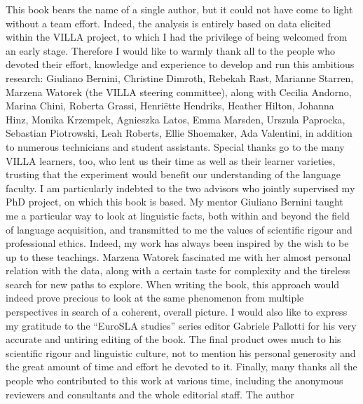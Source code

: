 
This book bears the name of a single author, but it could not have come to light without a team effort. Indeed, the analysis is entirely based on data elicited within the VILLA project, to which I had the privilege of being welcomed from an early stage. Therefore I would like to warmly thank all to the people who devoted their effort, knowledge and experience to develop and run this ambitious research: Giuliano Bernini, Christine Dimroth, Rebekah Rast, Marianne Starren, Marzena Watorek (the VILLA steering committee), along with Cecilia Andorno, Marina Chini, Roberta Grassi, Henriëtte Hendriks, Heather Hilton, Johanna Hinz, Monika Krzempek, Agnieszka Latos, Emma Marsden, Urszula Paprocka, Sebastian Piotrowski, Leah Roberts, Ellie Shoemaker, Ada Valentini, in addition to numerous technicians and student assistants. Special thanks go to the many VILLA learners, too, who lent us their time as well as their learner varieties, trusting that the experiment would benefit our understanding of the language faculty.
I am particularly indebted to the two advisors who jointly supervised my PhD project, on which this book is based. My mentor Giuliano Bernini taught me a particular way to look at linguistic facts, both within and beyond the field of language acquisition, and transmitted to me the values of scientific rigour and professional ethics. Indeed, my work has always been inspired by the wish to be up to these teachings. Marzena Watorek fascinated me with her almost personal relation with the data, along with a certain taste for complexity and the tireless search for new paths to explore. When writing the book, this approach would indeed prove precious to look at the same phenomenon from multiple perspectives in search of a coherent, overall picture.
I would also like to express my gratitude to the “EuroSLA studies” series editor Gabriele Pallotti for his very accurate and untiring editing of the book. The final product owes much to his scientific rigour and linguistic culture, not to mention his personal generosity and the great amount of time and effort he devoted to it. Finally, many thanks all the people who contributed to this work at various time, including the anonymous reviewers and consultants and the whole editorial staff.\medskip
{
\raggedleft
The author
}
